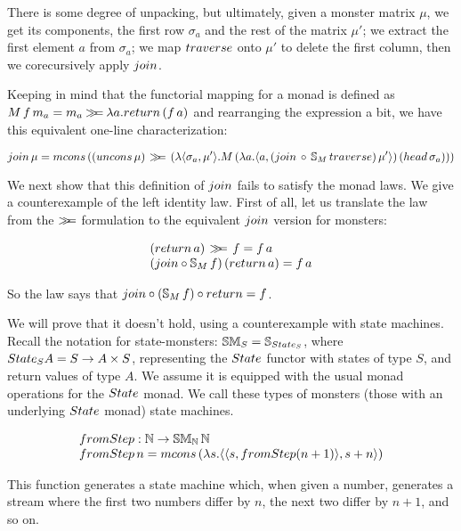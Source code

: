 There is some degree of unpacking, but ultimately, given a monster matrix $\mu$, we get its components, the first row $\sigma_a$ and the rest of the matrix $\mu'$; 
we extract the first element $a$ from $\sigma_a$;
we map $\traverse$ onto $\mu'$ to delete the first column, then we corecursively apply $\join$.

Keeping in mind that the functorial mapping for a monad is defined as $M\,f\,m_a = m_a \bind \lambda a. \return\,(f\,a)$ and rearranging the expression a bit, we have this equivalent one-line characterization:

$$
\join\, \mu = \mcons\, ((\uncons\, \mu) \, \bind \,(\lambda \pair{\sigma_a}{\mu'} . M\,(\lambda a . \pair{a}{(\join\, \comp\, \stream{M}\,\traverse)\, \mu'})\, (\head\, \sigma_a)))
$$

We next show that this definition of $\join$ fails to satisfy the monad laws.
We give a counterexample of the left identity law.
First of all, let us translate the law from the $\mathbin{\gg\!\!=}$ formulation to the equivalent $\join$ version for monsters:

$$
\begin{array}{l}
(\return\, a)\, \bind \, f = f\, a\\
(\join \comp \stream{M}\,f)\,(\return\,a) = f\,a
\end{array}
$$

So the law says that $\join \comp (\stream{M}\,f)\comp \return = f$.

We will prove that it doesn't hold, using a counterexample with state machines.
Recall the notation for state-monsters: $\stmon{S} = \stream{\state_S}$, where $\state_S A = S \rightarrow A \times S$, representing the $\state$ functor with states of type $S$, and return values of type $A$. 
We assume it is equipped with the usual monad operations for the $\state$ monad. We call these types of monsters (those with an underlying $\state$ monad) state machines.

$$
\begin{array}{l}
\fromstepstr : \nat \rightarrow \stmon{\nat}\,\nat \\
\fromstepstr\, n = \mcons\, (\lambda s. \pair{\pair{s}{\fromstepstr (n + 1)}}{s + n})
\end{array}
$$

This function generates a state machine which, when given a number, generates a stream where the first two numbers differ by $n$, the next two differ by $n + 1$, and so on.

